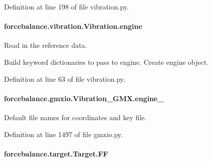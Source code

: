 Definition at line 198 of file vibration.\-py.

\hypertarget{classforcebalance_1_1vibration_1_1Vibration_ad72d6182d9f2d2a1ba97030635fbdb3d}{
\paragraph[{engine}]{\setlength{\rightskip}{0pt plus 5cm}forcebalance.\-vibration.\-Vibration.\-engine\hspace{0.3cm}{\ttfamily [inherited]}}}\label{classforcebalance_1_1vibration_1_1Vibration_ad72d6182d9f2d2a1ba97030635fbdb3d}


Read in the reference data. 

Build keyword dictionaries to pass to engine. Create engine object. 

Definition at line 63 of file vibration.\-py.

\hypertarget{classforcebalance_1_1gmxio_1_1Vibration__GMX_aa2da1db9dac5cfdae4ff6a0d6d14e0b4}{
\paragraph[{engine\-\_\-}]{\setlength{\rightskip}{0pt plus 5cm}forcebalance.\-gmxio.\-Vibration\-\_\-\-G\-M\-X.\-engine\-\_\-}}\label{classforcebalance_1_1gmxio_1_1Vibration__GMX_aa2da1db9dac5cfdae4ff6a0d6d14e0b4}


Default file names for coordinates and key file. 



Definition at line 1497 of file gmxio.\-py.

\hypertarget{classforcebalance_1_1target_1_1Target_a38a37919783141ea37fdcf8b00ce0aaf}{
\paragraph[{F\-F}]{\setlength{\rightskip}{0pt plus 5cm}forcebalance.\-target.\-Target.\-F\-F\hspace{0.3cm}{\ttfamily [inherited]}}}\label{classforcebalance_1_1target_1_1Target_a38a37919783141ea37fdcf8b00ce0aaf}


